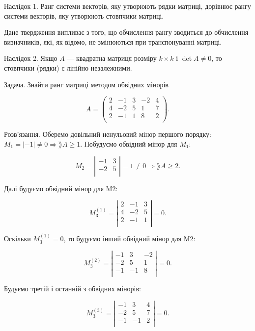 Наслідок 1. Ранг системи векторів, яку утворюють рядки матриці, дорівнює
рангу системи векторів, яку утворюють стовпчики матриці.


Дане твердження випливає з того, що обчислення рангу зводиться до
обчислення визначників, які, як відомо, не змінюються при транспонуванні
матриці.


Наслідок 2. Якщо $A$ --- квадратна матриця розміру $k \times k$ і $\det A \neq 0$, то
стовпчики (рядки) є лінійно незалежними.


Задача. Знайти ранг матриці методом обвідних мінорів

$$A = \begin{pmatrix}
	2 & -1 & 3 & -2 & 4 \\
	4 & -2 & 5 &  1 & 7 \\
	2 & -1 & 1 &  8 & 2	\\
\end{pmatrix}.$$

Розв’язання. Оберемо довільний ненульовий мінор першого порядку:
$M_1 = |-1| \neq 0 \Rightarrow \rang A \geqslant 1$. Побудуємо обвідний мінор для $M_1$:

$$M_2 = \left| \begin{matrix}
	-1 & 3 \\
	-2 & 5 \\
\end{matrix} \right| =  1 \neq 0 \Rightarrow \rang A \geqslant 2.$$

Далі будуємо обвідний мінор для M2:

$$M_3^{(1)} = \left| \begin{matrix}
	2 & -1 & 3 \\
	4 & -2 & 5 \\
	2 & -1 & 1 \\
\end{matrix} \right| = 0.$$

Оскільки $M_3^{(1)} = 0$, то будуємо інший обвідний мінор для M2:

$$M_3^{(2)} = \left| \begin{matrix}
	-1 &  3 & -2 \\
	-2 &  5 &  1 \\
	-1 & -1 &  8 \\
\end{matrix} \right| = 0.$$

Будуємо третій і останній з обвідних мінорів:

$$M_3^{(3)} = \left| \begin{matrix}
	-1 &  3 & 4 \\
	-2 &  5 & 7 \\
	-1 & -1 & 2 \\
\end{matrix} \right| = 0.$$

